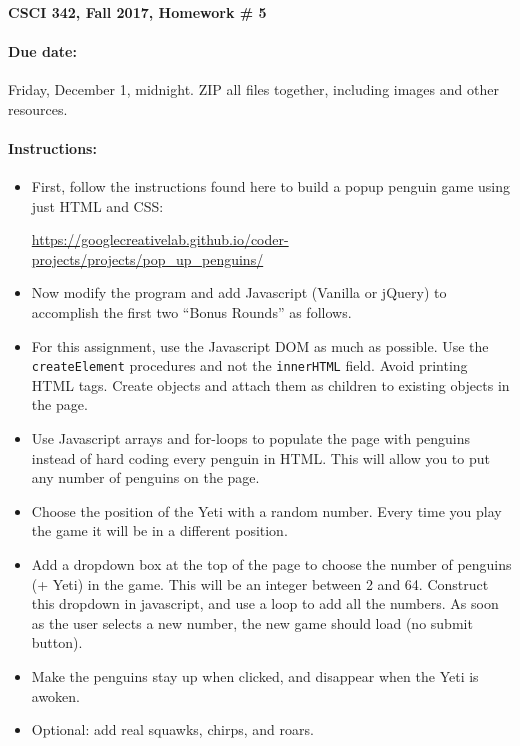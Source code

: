 \documentclass{article}
\newcommand{\myitem}{\paragraph}
\begin{document}
\myitem{CSCI 342, Fall 2017, Homework \# 5}

\myitem{Due date:}  Friday, December 1, midnight.  ZIP all files
together, including images and other resources.

\myitem{Instructions:}

\begin{itemize}
\item
First, follow the instructions found here to build a popup penguin game
using just HTML and CSS:

\centerline{\url{https://googlecreativelab.github.io/coder-projects/projects/pop_up_penguins/}}

\item Now modify the program and add Javascript (Vanilla or jQuery)
  to accomplish the first two ``Bonus Rounds'' as follows.

\item For this assignment, use the Javascript DOM as much as possible.
  Use the {\tt createElement} procedures and not the {\tt innerHTML}
  field.  Avoid printing HTML tags. Create objects and attach them as
  children to existing objects in the page.

\item Use Javascript arrays and for-loops to populate the page with
  penguins instead of hard coding every penguin in HTML.  This will
  allow you to put any number of penguins on the page.

\item Choose the position of the Yeti with a random number.  Every
  time you play the game it will be in a different position.
  
\item Add a dropdown box at the top of the page to choose the number
  of penguins (+ Yeti) in the game.  This will be an integer between 2
  and 64. Construct this dropdown in javascript, and use a loop to add
  all the numbers.  As soon as the user selects a new number, the new
  game should load (no submit button). 

\item Make the penguins stay up when clicked, and disappear when the
  Yeti is awoken.

\item Optional:  add real squawks, chirps, and roars.  

\end{itemize}
\end{document}
